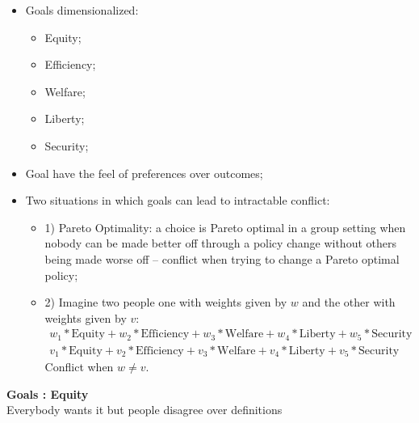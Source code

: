 \documentclass[aspectratio=169]{beamer}
\theoremstyle{principle}
\begin{document}
\begin{frame}

\begin{itemize}
\item Goals dimensionalized:
\begin{itemize}
\item Equity;
\item Efficiency;
\item Welfare;
\item Liberty;
\item Security;
\bigskip
\end{itemize}
\item Goal have the feel of preferences over outcomes;
\bigskip
\item Two situations in which goals can lead to intractable conflict:
\begin{itemize}
\item 1) Pareto Optimality: a choice is Pareto optimal in a group setting when nobody can be made better off through a policy change without others being made worse off -- conflict when trying to change a Pareto optimal policy;
\item 2) Imagine two people one with weights given by $w$ and the other with weights given by $v$:
\begin{align*}
w_{1}*\mbox{Equity} + w_2*\mbox{Efficiency} + w_3*\mbox{Welfare} + w_4*\mbox{Liberty} + w_5*\mbox{Security}\\
v_{1}*\mbox{Equity} + v_2*\mbox{Efficiency} + v_3*\mbox{Welfare} + v_4*\mbox{Liberty} + v_5*\mbox{Security}
\end{align*}
Conflict when $w\neq v$.
\end{itemize}

\end{itemize}

\end{frame}

\begin{frame}

\begin{center}
\Huge\textbf{Goals : Equity}\\
\bigskip
\bigskip
\bigskip
\normalsize Everybody wants it but people disagree over definitions
\end{center}

\end{frame}
\end{document}
